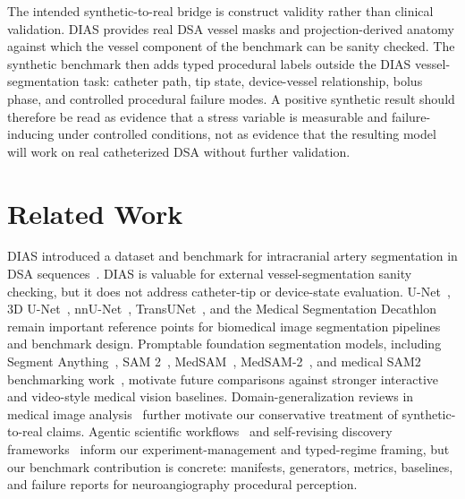 \documentclass[10pt]{article}
\begin{document}
The intended synthetic-to-real bridge is construct validity rather than clinical validation. DIAS provides real DSA vessel masks and projection-derived anatomy against which the vessel component of the benchmark can be sanity checked. The synthetic benchmark then adds typed procedural labels outside the DIAS vessel-segmentation task: catheter path, tip state, device-vessel relationship, bolus phase, and controlled procedural failure modes. A positive synthetic result should therefore be read as evidence that a stress variable is measurable and failure-inducing under controlled conditions, not as evidence that the resulting model will work on real catheterized DSA without further validation.

\section{Related Work}
DIAS introduced a dataset and benchmark for intracranial artery segmentation in DSA sequences~\cite{dias2024}. DIAS is valuable for external vessel-segmentation sanity checking, but it does not address catheter-tip or device-state evaluation. U-Net~\cite{unet2015}, 3D U-Net~\cite{cicek2016_3dunet}, nnU-Net~\cite{nnunet2018}, TransUNet~\cite{transunet2021}, and the Medical Segmentation Decathlon~\cite{medicaldecathlon2019} remain important reference points for biomedical image segmentation pipelines and benchmark design. Promptable foundation segmentation models, including Segment Anything~\cite{sam2023}, SAM 2~\cite{sam2_2024}, MedSAM~\cite{medsam2024}, MedSAM-2~\cite{medsam2_2024}, and medical SAM2 benchmarking work~\cite{sam2medical2024}, motivate future comparisons against stronger interactive and video-style medical vision baselines. Domain-generalization reviews in medical image analysis~\cite{yoon2024_domain_generalization} further motivate our conservative treatment of synthetic-to-real claims. Agentic scientific workflows~\cite{aiscientistv2_2025} and self-revising discovery frameworks~\cite{selfrevising2026} inform our experiment-management and typed-regime framing, but our benchmark contribution is concrete: manifests, generators, metrics, baselines, and failure reports for neuroangiography procedural perception.
\end{document}
